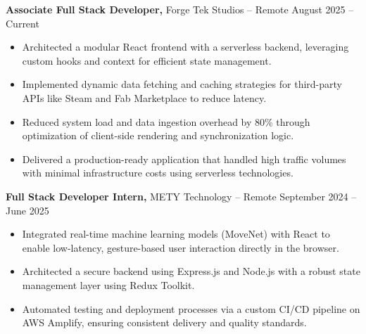 \documentclass[11pt]{article}       %
\begin{document}
\textbf{Associate Full Stack Developer,} {Forge Tek Studios} -- Remote \hfill August 2025 -- Current 
\vspace{-9pt}
\begin{itemize}
  \item Architected a modular React frontend with a serverless backend, leveraging custom hooks and context for efficient state management.
  \item Implemented dynamic data fetching and caching strategies for third-party APIs like Steam and Fab Marketplace to reduce latency.
  \item Reduced system load and data ingestion overhead by 80\% through optimization of client-side rendering and synchronization logic.
  \item Delivered a production-ready application that handled high traffic volumes with minimal infrastructure costs using serverless technologies.
\end{itemize}

\textbf{Full Stack Developer Intern,} {METY Technology} -- Remote \hfill September 2024 -- June 2025 
\vspace{-9pt}
\begin{itemize}
  \item Integrated real-time machine learning models (MoveNet) with React to enable low-latency, gesture-based user interaction directly in the browser.
  \item Architected a secure backend using Express.js and Node.js with a robust state management layer using Redux Toolkit.
  \item Automated testing and deployment processes via a custom CI/CD pipeline on AWS Amplify, ensuring consistent delivery and quality standards.
\end{itemize}
\end{document}

